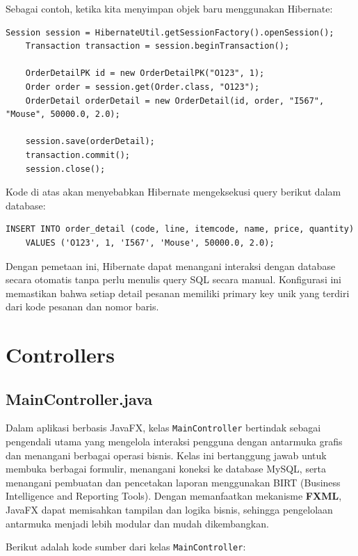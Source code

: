Sebagai contoh, ketika kita menyimpan objek baru menggunakan Hibernate:

\begin{lstlisting}[style=JavaStyle]
	Session session = HibernateUtil.getSessionFactory().openSession();
	Transaction transaction = session.beginTransaction();
	
	OrderDetailPK id = new OrderDetailPK("O123", 1);
	Order order = session.get(Order.class, "O123");
	OrderDetail orderDetail = new OrderDetail(id, order, "I567", "Mouse", 50000.0, 2.0);
	
	session.save(orderDetail);
	transaction.commit();
	session.close();
\end{lstlisting}

Kode di atas akan menyebabkan Hibernate mengeksekusi query berikut dalam database:

\begin{lstlisting}[style=sql]
	INSERT INTO order_detail (code, line, itemcode, name, price, quantity) 
	VALUES ('O123', 1, 'I567', 'Mouse', 50000.0, 2.0);
\end{lstlisting}

Dengan pemetaan ini, Hibernate dapat menangani interaksi dengan database secara otomatis tanpa perlu menulis query SQL secara manual. Konfigurasi ini memastikan bahwa setiap detail pesanan memiliki primary key unik yang terdiri dari kode pesanan dan nomor baris.

\section{Controllers}


\subsection{MainController.java}

Dalam aplikasi berbasis JavaFX, kelas \texttt{MainController} bertindak sebagai pengendali utama yang mengelola interaksi pengguna dengan antarmuka grafis dan menangani berbagai operasi bisnis. Kelas ini bertanggung jawab untuk membuka berbagai formulir, menangani koneksi ke database MySQL, serta menangani pembuatan dan pencetakan laporan menggunakan BIRT (Business Intelligence and Reporting Tools). Dengan memanfaatkan mekanisme \textbf{FXML}, JavaFX dapat memisahkan tampilan dan logika bisnis, sehingga pengelolaan antarmuka menjadi lebih modular dan mudah dikembangkan.

Berikut adalah kode sumber dari kelas \texttt{MainController}:

